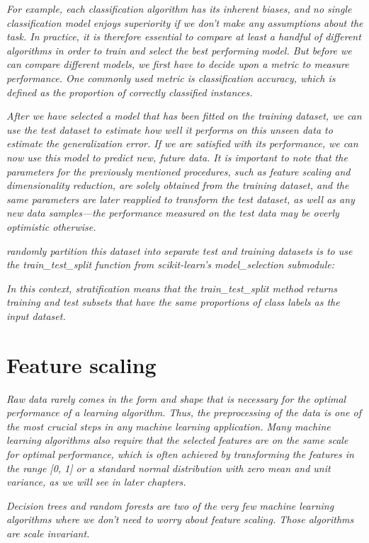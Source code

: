 \textit{For example, each classification algorithm has its inherent biases, and no single classification model enjoys superiority if we don't make any assumptions about the task. In practice, it is therefore essential to compare at least a handful of different algorithms in order to train and select the best performing model. But before we can compare different models, we first have to decide upon a metric to measure performance. One commonly used metric is classification accuracy, which is defined as the proportion of correctly classified instances.}

\textit{After we have selected a model that has been fitted on the training dataset, we can use the test dataset to estimate how well it performs on this unseen data to estimate the generalization error. If we are satisfied with its performance, we can now use this model to predict new, future data. It is important to note that the parameters for the previously mentioned procedures, such as feature scaling and dimensionality reduction, are solely obtained from the training dataset, and the same parameters are later reapplied to transform the test dataset, as well as any new data samples—the performance measured on the test data may be overly optimistic otherwise.}

\textit{randomly partition this dataset into separate test and training datasets is to use the train_test_split function from scikit-learn's model_selection submodule:}

\textit{In this context, stratification means that the train\_test\_split method returns training and test subsets that have the same proportions of class labels as the input dataset.}

\section{Feature scaling} \label{sec:feature_scaling}

\textit{Raw data rarely comes in the form and shape that is necessary for the optimal performance of a learning algorithm. Thus, the preprocessing of the data is one of the most crucial steps in any machine learning application. Many machine learning algorithms also require that the selected features are on the same scale for optimal performance, which is often achieved by transforming the features in the range [0, 1] or a standard normal distribution with zero mean and unit variance, as we will see in later chapters.}

\textit{Decision trees and random forests are two of the very few machine learning algorithms where we don't need to worry about feature scaling. Those algorithms are scale invariant.}

